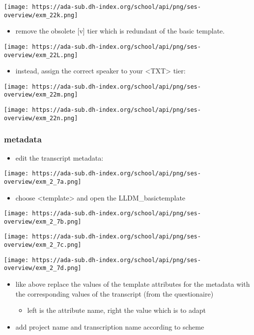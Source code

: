 \documentclass[
  12pt,
]{article}
\providecommand{\tightlist}{%
  \setlength{\itemsep}{0pt}\setlength{\parskip}{0pt}}
\begin{document}
\texttt{[image: https://ada-sub.dh-index.org/school/api/png/ses-overview/exm\_22k.png]}

\begin{itemize}
\tightlist
\item
  remove the obsolete {[}v{]} tier which is redundant of the basic
  template.
\end{itemize}

\texttt{[image: https://ada-sub.dh-index.org/school/api/png/ses-overview/exm\_22L.png]}

\begin{itemize}
\tightlist
\item
  instead, assign the correct speaker to your
  \textless TXT\textgreater{} tier:
\end{itemize}

\texttt{[image: https://ada-sub.dh-index.org/school/api/png/ses-overview/exm\_22m.png]}

\texttt{[image: https://ada-sub.dh-index.org/school/api/png/ses-overview/exm\_22n.png]}

\hypertarget{metadata-1}{%
\subsubsection{metadata}\label{metadata-1}}

\begin{itemize}
\tightlist
\item
  edit the transcript metadata:
\end{itemize}

\texttt{[image: https://ada-sub.dh-index.org/school/api/png/ses-overview/exm\_2\_7a.png]}

\begin{itemize}
\tightlist
\item
  choose \textless template\textgreater{} and open the
  LLDM\_basictemplate
\end{itemize}

\texttt{[image: https://ada-sub.dh-index.org/school/api/png/ses-overview/exm\_2\_7b.png]}

\texttt{[image: https://ada-sub.dh-index.org/school/api/png/ses-overview/exm\_2\_7c.png]}

\texttt{[image: https://ada-sub.dh-index.org/school/api/png/ses-overview/exm\_2\_7d.png]}

\begin{itemize}
\tightlist
\item
  like above replace the values of the template attributes for the
  metadata with the corresponding values of the transcript (from the
  questionaire)

  \begin{itemize}
  \tightlist
  \item
    left is the attribute name, right the value which is to adapt
  \end{itemize}
\item
  add project name and transcription name according to scheme
\end{itemize}
\end{document}

